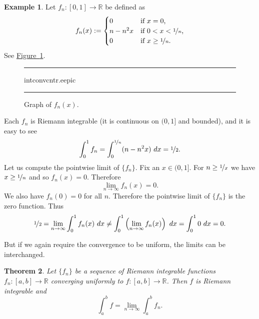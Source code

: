 \documentclass[12pt]{book}
\newenvironment{myfigureht}{%
\begin{figure}[h!t]
\noindent\rule{\textwidth}{0.4pt}\vspace{12pt}\par\centering}%
{\par\noindent\rule{\textwidth}{0.4pt}
\end{figure}}
\newcommand{\R}{{\mathbb{R}}}
\theoremstyle{plain}
\newtheorem{thm}{Theorem}[section]
\theoremstyle{remark}
\theoremstyle{definition}
\theoremstyle{exercise}
\theoremstyle{example}
\newtheorem{example}[thm]{Example}
\newcommand{\figureref}[1]{\hyperref[#1]{Figure~\ref*{#1}}}
\begin{document}
\begin{example}
Let $f_n \colon [0,1] \to \R$
be defined as
\begin{equation*}
f_n(x) :=
\begin{cases}
0 &  \text{if $x = 0$,}\\
n-n^2x &  \text{if $0 < x < \nicefrac{1}{n}$,}\\
0 &  \text{if $x \geq \nicefrac{1}{n}$.}
\end{cases}
\end{equation*}
See \figureref{intconvcntr:fig}.

\begin{myfigureht}
{intconvcntr.eepic}
\caption{Graph of $f_n(x)$.%
\label{intconvcntr:fig}}
\end{myfigureht}

Each $f_n$ is Riemann integrable (it is continuous on $(0,1]$ and bounded),
and it is easy to see
\begin{equation*}
\int_0^1 f_n =
\int_0^{\nicefrac{1}{n}} (n-n^2x)~dx = \nicefrac{1}{2} .
\end{equation*}
Let us compute the pointwise limit of $\{ f_n \}$.
Fix an $x \in (0,1]$.  For $n \geq \nicefrac{1}{x}$
we have $x \geq \nicefrac{1}{n}$ and so $f_n(x) = 0$.  Therefore
\begin{equation*}
\lim_{n \to \infty} f_n(x) = 0.
\end{equation*}
We also have $f_n(0) = 0$ for all $n$.  Therefore the pointwise
limit of $\{ f_n \}$ is the zero function.  Thus
\begin{equation*}
\nicefrac{1}{2} =
\lim_{n\to\infty}
\int_0^1 f_n (x)~dx
\not=
\int_0^1
\left(
\lim_{n\to\infty}
f_n(x)\right)~dx
=
\int_0^1 0~dx = 0 .
\end{equation*}
\end{example}

But
if we again require the convergence to be uniform, the limits can
be interchanged.

\begin{thm} \label{integralinterchange:thm}
Let $\{ f_n \}$ be a sequence of Riemann integrable
functions
$f_n \colon [a,b] \to \R$
converging uniformly to $f \colon [a,b]
\to \R$.  Then $f$ is Riemann integrable and
\begin{equation*}
\int_a^b f = \lim_{n\to\infty} \int_a^b f_n .
\end{equation*}
\end{thm}
\end{document}
